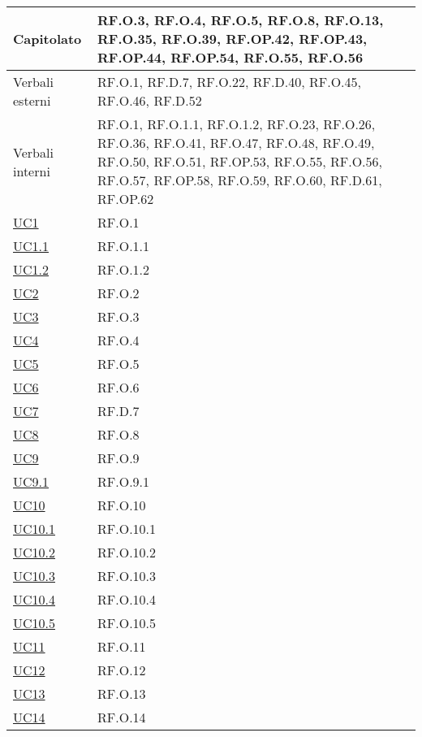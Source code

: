\begin{adjustwidth}{-0.5cm}{-0.5cm}
\begin{longtable}{|P{4,5cm}|>{\arraybackslash}P{9cm}|}
    Capitolato & RF.O.3, RF.O.4, RF.O.5, RF.O.8, RF.O.13, RF.O.35, RF.O.39, RF.OP.42, RF.OP.43, RF.OP.44, RF.OP.54, RF.O.55, RF.O.56 \\
    \hline
    Verbali esterni & RF.O.1, RF.D.7, RF.O.22, RF.D.40, RF.O.45, RF.O.46, RF.D.52 \\
    \hline
    Verbali interni & RF.O.1, RF.O.1.1, RF.O.1.2, RF.O.23, RF.O.26, RF.O.36, RF.O.41, RF.O.47, RF.O.48, RF.O.49, RF.O.50, RF.O.51, RF.OP.53, RF.O.55, RF.O.56, RF.O.57, RF.OP.58, RF.O.59, RF.O.60, RF.D.61, RF.OP.62 \\
    \hline
    \hyperref[UC1]{UC1} & RF.O.1 \\
    \hline
    \hyperref[UC1point1]{UC1.1} & RF.O.1.1 \\
    \hline
    \hyperref[UC1point2]{UC1.2} & RF.O.1.2 \\
    \hline
    \hyperref[UC2]{UC2} & RF.O.2 \\
    \hline
    \hyperref[UC3]{UC3} & RF.O.3 \\
    \hline
    \hyperref[UC4]{UC4} & RF.O.4 \\
    \hline
    \hyperref[UC5]{UC5} & RF.O.5 \\
    \hline
    \hyperref[UC6]{UC6} & RF.O.6 \\
    \hline
    \hyperref[UC7]{UC7} & RF.D.7 \\
    \hline
    \hyperref[UC8]{UC8} & RF.O.8 \\
    \hline
    \hyperref[UC9]{UC9} & RF.O.9 \\
    \hline
    \hyperref[UC9point1]{UC9.1} & RF.O.9.1 \\
    \hline
    \hyperref[UC10]{UC10} & RF.O.10 \\
    \hline
    \hyperref[UC10point1]{UC10.1} & RF.O.10.1 \\ 
    \hline
    \hyperref[UC10point2]{UC10.2} & RF.O.10.2\\
    \hline
    \hyperref[UC10point3]{UC10.3} & RF.O.10.3\\
    \hline
    \hyperref[UC10point4]{UC10.4} & RF.O.10.4\\
    \hline
    \hyperref[UC10point5]{UC10.5} & RF.O.10.5\\
    \hline
    \hyperref[UC11]{UC11} & RF.O.11 \\
    \hline
    \hyperref[UC12]{UC12} & RF.O.12 \\
    \hline
    \hyperref[UC13]{UC13} & RF.O.13 \\
    \hline
    \hyperref[UC14]{UC14} & RF.O.14 \\

\end{longtable}
\end{adjustwidth}
